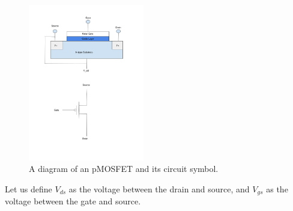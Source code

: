 \documentclass[
  reprint,
  amsmath,amssymb,
  aps
]{revtex4-1}
\begin{document}
\begin{figure}[H]
    \centering
        \includegraphics[width=0.45\textwidth]{pmosfet.png}
    \caption{A diagram of an pMOSFET and its circuit symbol.}
    \label{fig:pmosfet}
\end{figure}
Let us define $V_{ds}$ as the voltage between the drain and source, and $V_{gs}$ as the voltage between the gate and source.
\end{document}

